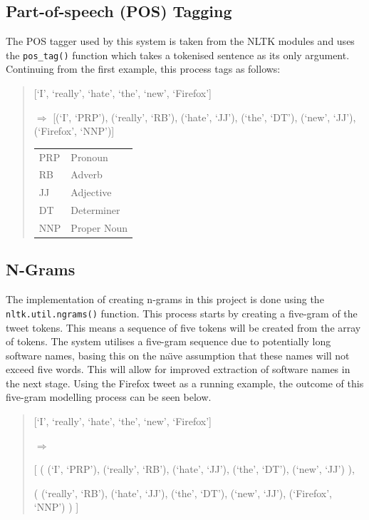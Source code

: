 \subsection{Part-of-speech (POS) Tagging}
The POS tagger used by this system is taken from the NLTK modules and uses the \texttt{pos\_tag()} function which takes a tokenised sentence as its only argument. Continuing from the first example, this process tags as follows: 
\begin{quote}
[`I', `really', `hate', `the', `new', `Firefox']

\begin{math}\Rightarrow\end{math}
[(`I', `PRP'), (`really', `RB'), (`hate', `JJ'), (`the', `DT'), (`new', `JJ'), (`Firefox', `NNP')]

\begin{center}
\begin{tabular}{ l | l }
  \hline                        
  PRP & Pronoun \\
  RB & Adverb \\
  JJ & Adjective \\
  DT & Determiner \\
  NNP & Proper Noun \\
  \hline  
\end{tabular}
\end{center}
\end{quote}

\subsection{N-Grams}
The implementation of creating n-grams in this project is done using the \texttt{nltk.util.ngrams()} function. This process starts by creating a five-gram of the tweet tokens. This means a sequence of five tokens will be created from the array of tokens. The system utilises a five-gram sequence due to potentially long software names, basing this on the na\"{\i}ve assumption that these names will not exceed five words. This will allow for improved extraction of software names in the next stage. Using the Firefox tweet as a running example, the outcome of this five-gram modelling process can be seen below.

\begin{quote}
[`I', `really', `hate', `the', `new', `Firefox']

\begin{math}\Rightarrow\end{math}

[
 ( (`I', `PRP'), (`really', `RB'), (`hate', `JJ'), (`the', `DT'), (`new', `JJ') ),

 ( (`really', `RB'), (`hate', `JJ'), (`the', `DT'), (`new', `JJ'), (`Firefox', `NNP') )
]
\end{quote}


